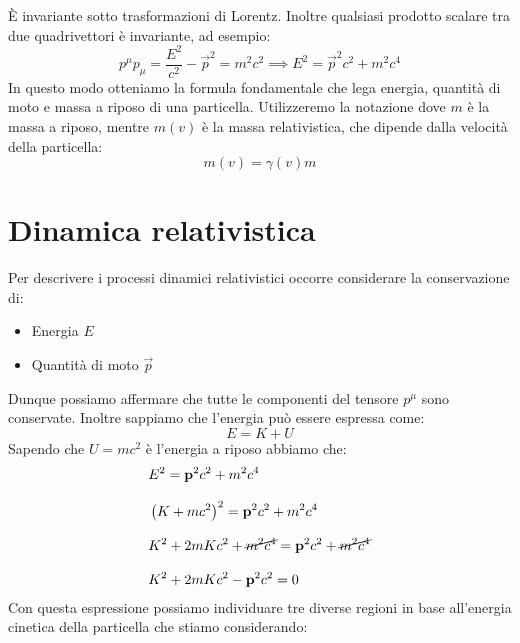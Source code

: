 È invariante sotto trasformazioni di Lorentz. Inoltre qualsiasi prodotto scalare tra due quadrivettori è invariante, ad esempio:
\begin{equation}
    p^\mu p_\mu = \dfrac{E^2}{c^2} - \vec{p}^2 = m^2 c^2 \implies E^2 = \vec{p}^2c^2 + m^2 c^4
\end{equation}
In questo modo otteniamo la formula fondamentale che lega energia, quantità di moto e massa a riposo di una particella. Utilizzeremo la notazione dove $m$ è la massa a riposo, mentre $m(v)$ è la massa relativistica, che dipende dalla velocità della particella:
\begin{equation}
    m(v) = \gamma(v) m
\end{equation}
\section{Dinamica relativistica}
Per descrivere i processi dinamici relativistici occorre considerare la conservazione di:
\begin{itemize}
    \item Energia $E$
    \item Quantità di moto $\vec{p}$
\end{itemize}
Dunque possiamo affermare che tutte le componenti del tensore $p^\mu$ sono conservate. Inoltre sappiamo che l'energia può essere espressa come:
\begin{equation}
    E = K + U
\end{equation}
Sapendo che $U = mc^2$ è l'energia a riposo abbiamo che:
\begin{equation}
    \begin{split}
        &E^2 = \vb{p}^2c^2 + m^2c^4 \\[8pt]
        &\left(K + mc^2\right)^2 = \vb{p}^2c^2 + m^2c^4 \\[8pt]
        &K^2 + 2mKc^2 + \cancel{m^2c^4} = \vb{p}^2c^2 + \cancel{m^2c^4} \\[8pt]
        &K^2 + 2mKc^2 - \vb{p}^2c^2 = 0
    \end{split}
\end{equation}
Con questa espressione possiamo individuare tre diverse regioni in base all'energia cinetica della particella che stiamo considerando:
